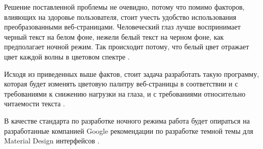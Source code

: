 Решение поставленной проблемы не очевидно, потому что помимо факторов, влияющих на здоровье пользователя, стоит учесть удобство использования преобразованными веб-страницами. Человеческий глаз лучше воспринимает черный текст на белом фоне, нежели белый текст на черном фоне, как предполагает ночной режим. Так происходит потому, что белый цвет отражает цвет каждой волны в цветовом спектре \cite{whitecolor}.

Исходя из приведенных выше фактов, стоит задача разработать такую программу, которая будет изменять цветовую палитру веб-страницы в соответствии и с требованиями к снижению нагрузки на глаза, и с требованиями относительно читаемости текста \cite{wcag}.

В качестве стандарта по разработке ночного режима работа будет опираться на разработанные компанией Google рекомендации по разработке темной темы для Material Design интерфейсов \cite{material}. 